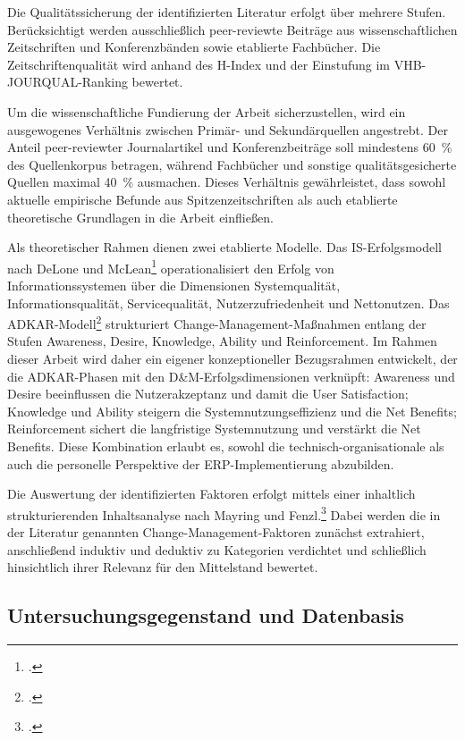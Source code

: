 
Die Qualitätssicherung der identifizierten Literatur erfolgt über mehrere Stufen. Berücksichtigt werden ausschlie\ss{}lich peer-reviewte Beiträge aus wissenschaftlichen Zeitschriften und Konferenzbänden sowie etablierte Fachbücher. Die Zeitschriftenqualität wird anhand des H-Index und der Einstufung im VHB-JOURQUAL-Ranking bewertet.

Um die wissenschaftliche Fundierung der Arbeit sicherzustellen, wird ein ausgewogenes Verhältnis zwischen Primär- und Sekundärquellen angestrebt. Der Anteil peer-reviewter Journalartikel und Konferenzbeiträge soll mindestens 60~\% des Quellenkorpus betragen, während Fachbücher und sonstige qualitätsgesicherte Quellen maximal 40~\% ausmachen. Dieses Verhältnis gewährleistet, dass sowohl aktuelle empirische Befunde aus Spitzenzeitschriften als auch etablierte theoretische Grundlagen in die Arbeit einfließen.

Als theoretischer Rahmen dienen zwei etablierte Modelle. Das IS-Erfolgsmodell nach DeLone und McLean\footcite[Vgl.][S.~13--16]{delone2003} operationalisiert den Erfolg von Informationssystemen über die Dimensionen Systemqualität, Informationsqualität, Servicequalität, Nutzerzufriedenheit und Nettonutzen. Das ADKAR-Modell\footcite[Vgl.][S.~126--127]{galli2018} strukturiert Change-Management-Ma\ss{}nahmen entlang der Stufen Awareness, Desire, Knowledge, Ability und Reinforcement. Im Rahmen dieser Arbeit wird daher ein eigener konzeptioneller Bezugsrahmen entwickelt, der die ADKAR-Phasen mit den D\&M-Erfolgsdimensionen verknüpft: Awareness und Desire beeinflussen die Nutzerakzeptanz und damit die User Satisfaction; Knowledge und Ability steigern die Systemnutzungseffizienz und die Net Benefits; Reinforcement sichert die langfristige Systemnutzung und verstärkt die Net Benefits. Diese Kombination erlaubt es, sowohl die technisch-organisationale als auch die personelle Perspektive der ERP-Implementierung abzubilden.

Die Auswertung der identifizierten Faktoren erfolgt mittels einer inhaltlich strukturierenden Inhaltsanalyse nach Mayring und Fenzl.\footcite[Vgl.][S.~633--648]{mayring2019} Dabei werden die in der Literatur genannten Change-Management-Faktoren zunächst extrahiert, anschlie\ss{}end induktiv und deduktiv zu Kategorien verdichtet und schlie\ss{}lich hinsichtlich ihrer Relevanz für den Mittelstand bewertet.

\subsection{Untersuchungsgegenstand und Datenbasis}

